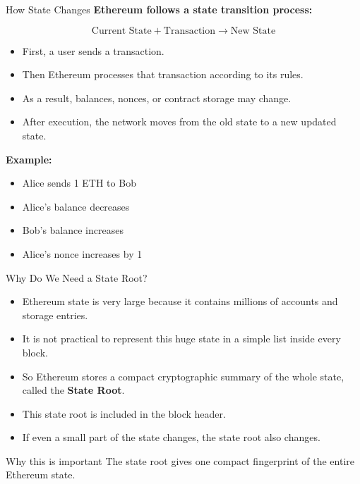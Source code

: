 \documentclass{beamer}
\begin{document}
\begin{frame}{How State Changes}
\textbf{Ethereum follows a state transition process:}

\[
\text{Current State} + \text{Transaction} \rightarrow \text{New State}
\]

\begin{itemize}
    \item First, a user sends a transaction.
    \item Then Ethereum processes that transaction according to its rules.
    \item As a result, balances, nonces, or contract storage may change.
    \item After execution, the network moves from the old state to a new updated state.
\end{itemize}

\vspace{0.3cm}
\textbf{Example:}
\begin{itemize}
    \item Alice sends 1 ETH to Bob
    \item Alice's balance decreases
    \item Bob's balance increases
    \item Alice's nonce increases by 1
\end{itemize}
\end{frame}

\begin{frame}{Why Do We Need a State Root?}
\begin{itemize}
    \item Ethereum state is very large because it contains millions of accounts and storage entries.
    \item It is not practical to represent this huge state in a simple list inside every block.
    \item So Ethereum stores a compact cryptographic summary of the whole state, called the \textbf{State Root}.
    \item This state root is included in the block header.
    \item If even a small part of the state changes, the state root also changes.
\end{itemize}

\vspace{0.3cm}
\begin{block}{Why this is important}
The state root gives one compact fingerprint of the entire Ethereum state.
\end{block}
\end{frame}
\end{document}
